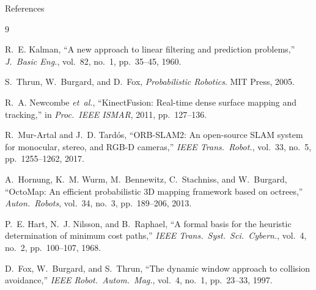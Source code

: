 \documentclass[aspectratio=169, 10pt]{beamer}
\begin{document}
\begin{frame}[allowframebreaks]{References}
  \footnotesize
  \begin{thebibliography}{9}

    R.~E. Kalman, ``A new approach to linear filtering and prediction
    problems,'' \emph{J.\ Basic Eng.}, vol.~82, no.~1,
    pp.~35--45, 1960.

    S.~Thrun, W.~Burgard, and D.~Fox,
    \emph{Probabilistic Robotics}. MIT Press, 2005.

    R.~A. Newcombe \emph{et~al.}, ``KinectFusion: Real-time dense
    surface mapping and tracking,'' in \emph{Proc.\ IEEE ISMAR},
    2011, pp.~127--136.

    R.~Mur-Artal and J.~D. Tard\'{o}s, ``ORB-SLAM2: An open-source
    SLAM system for monocular, stereo, and RGB-D cameras,''
    \emph{IEEE Trans.\ Robot.}, vol.~33, no.~5,
    pp.~1255--1262, 2017.

    A.~Hornung, K.~M. Wurm, M.~Bennewitz, C.~Stachniss, and
    W.~Burgard, ``OctoMap: An efficient probabilistic 3D mapping
    framework based on octrees,'' \emph{Auton.\ Robots},
    vol.~34, no.~3, pp.~189--206, 2013.

    P.~E. Hart, N.~J. Nilsson, and B.~Raphael, ``A formal basis for
    the heuristic determination of minimum cost paths,''
    \emph{IEEE Trans.\ Syst.\ Sci.\ Cybern.}, vol.~4, no.~2,
    pp.~100--107, 1968.

    D.~Fox, W.~Burgard, and S.~Thrun, ``The dynamic window approach
    to collision avoidance,'' \emph{IEEE Robot.\ Autom.\ Mag.},
    vol.~4, no.~1, pp.~23--33, 1997.

  \end{thebibliography}
\end{frame}
\end{document}
